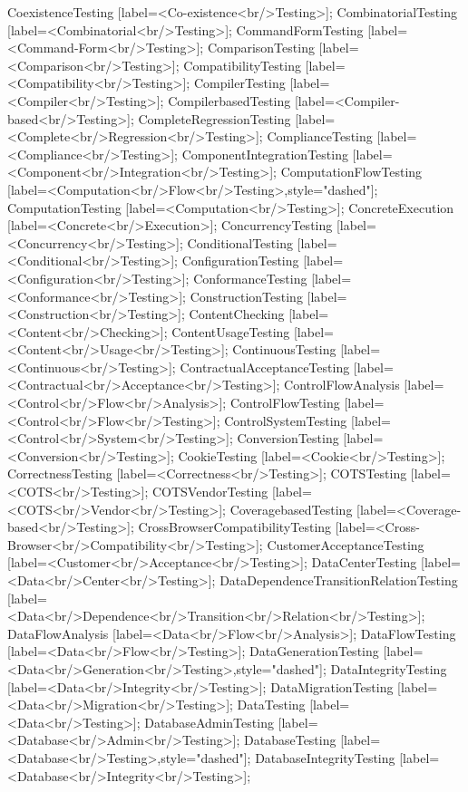 \documentclass{article}
\begin{document}
{CoexistenceTesting [label=<Co-existence<br/>Testing>];
CombinatorialTesting [label=<Combinatorial<br/>Testing>];
CommandFormTesting [label=<Command-Form<br/>Testing>];
ComparisonTesting [label=<Comparison<br/>Testing>];
CompatibilityTesting [label=<Compatibility<br/>Testing>];
CompilerTesting [label=<Compiler<br/>Testing>];
CompilerbasedTesting [label=<Compiler-based<br/>Testing>];
CompleteRegressionTesting [label=<Complete<br/>Regression<br/>Testing>];
ComplianceTesting [label=<Compliance<br/>Testing>];
ComponentIntegrationTesting [label=<Component<br/>Integration<br/>Testing>];
ComputationFlowTesting [label=<Computation<br/>Flow<br/>Testing>,style="dashed"];
ComputationTesting [label=<Computation<br/>Testing>];
ConcreteExecution [label=<Concrete<br/>Execution>];
ConcurrencyTesting [label=<Concurrency<br/>Testing>];
ConditionalTesting [label=<Conditional<br/>Testing>];
ConfigurationTesting [label=<Configuration<br/>Testing>];
ConformanceTesting [label=<Conformance<br/>Testing>];
ConstructionTesting [label=<Construction<br/>Testing>];
ContentChecking [label=<Content<br/>Checking>];
ContentUsageTesting [label=<Content<br/>Usage<br/>Testing>];
ContinuousTesting [label=<Continuous<br/>Testing>];
ContractualAcceptanceTesting [label=<Contractual<br/>Acceptance<br/>Testing>];
ControlFlowAnalysis [label=<Control<br/>Flow<br/>Analysis>];
ControlFlowTesting [label=<Control<br/>Flow<br/>Testing>];
ControlSystemTesting [label=<Control<br/>System<br/>Testing>];
ConversionTesting [label=<Conversion<br/>Testing>];
CookieTesting [label=<Cookie<br/>Testing>];
CorrectnessTesting [label=<Correctness<br/>Testing>];
COTSTesting [label=<COTS<br/>Testing>];
COTSVendorTesting [label=<COTS<br/>Vendor<br/>Testing>];
CoveragebasedTesting [label=<Coverage-based<br/>Testing>];
CrossBrowserCompatibilityTesting [label=<Cross-Browser<br/>Compatibility<br/>Testing>];
CustomerAcceptanceTesting [label=<Customer<br/>Acceptance<br/>Testing>];
DataCenterTesting [label=<Data<br/>Center<br/>Testing>];
DataDependenceTransitionRelationTesting [label=<Data<br/>Dependence<br/>Transition<br/>Relation<br/>Testing>];
DataFlowAnalysis [label=<Data<br/>Flow<br/>Analysis>];
DataFlowTesting [label=<Data<br/>Flow<br/>Testing>];
DataGenerationTesting [label=<Data<br/>Generation<br/>Testing>,style="dashed"];
DataIntegrityTesting [label=<Data<br/>Integrity<br/>Testing>];
DataMigrationTesting [label=<Data<br/>Migration<br/>Testing>];
DataTesting [label=<Data<br/>Testing>];
DatabaseAdminTesting [label=<Database<br/>Admin<br/>Testing>];
DatabaseTesting [label=<Database<br/>Testing>,style="dashed"];
DatabaseIntegrityTesting [label=<Database<br/>Integrity<br/>Testing>];
}
\end{document}
